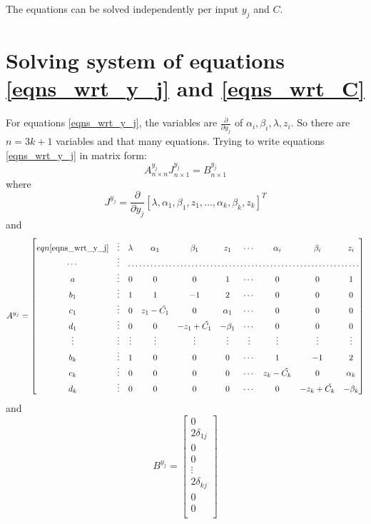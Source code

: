 \documentclass[11 pt]{article}
\begin{document}
The equations can be solved independently per input $y_j$ and $C$.


\section{Solving system of equations \ref{eqns_wrt_y_j} and \ref{eqns_wrt_C}} \label{section_solving_eqns}

For equations \ref{eqns_wrt_y_j}, the variables are $\frac{\partial}{\partial y_j}$ of $\alpha_i,\beta_i,\lambda,z_i$. So there are $n=3k + 1$ variables and that many equations.
Trying to write equations \ref{eqns_wrt_y_j} in matrix form:
\[A_{n \times n}^{y_j}J_{n \times 1}^{y_j} = B_{n \times 1}^{y_j}\]
where
\[J^{y_j} = \frac{\partial}{\partial y_j}[\lambda,\alpha_1,\beta_1,z_1,...,\alpha_k,\beta_k,z_k]^T\]
and
\[
A^{y_j} = \begin{bmatrix}
    eqn \ref{eqns_wrt_y_j} & \vdots & \lambda & \alpha_1 & \beta_1 & z_1 & \cdots & \alpha_i & \beta_i & z_i \\
    \cdots & \vdots & \hdotsfor{8} \\
    a & \vdots & 0 & 0 & 0 & 1 & \cdots & 0 & 0 & 1 \\
    b_1 & \vdots & 1 & 1 & -1 & 2 & \cdots & 0 & 0 & 0 \\
    c_1 & \vdots & 0 & z_1-\hat{C_1} & 0 & \alpha_1 & \cdots & 0 & 0 & 0 \\
    d_1 & \vdots & 0 & 0 & -z_1+\check{C_1} & -\beta_1 & \cdots & 0 & 0 & 0 \\
    \vdots & \vdots & \vdots & \vdots & \vdots & \vdots & \vdots & \vdots & \vdots & \vdots \\
    b_k & \vdots & 1 & 0 & 0 & 0 & \cdots & 1 & -1 & 2 \\
    c_k & \vdots & 0 & 0 & 0 & 0 & \cdots & z_k-\hat{C_k} & 0 & \alpha_k \\
    d_k & \vdots & 0 & 0 & 0 & 0 & \cdots & 0 & -z_k+\check{C_k} & -\beta_k \\
\end{bmatrix}
\]
and
\[
B^{y_j} = \begin{bmatrix}
    0 \\
    2\delta_{1j} \\
    0 \\
    0 \\
    \vdots \\
    2\delta_{kj} \\
    0 \\
    0 \\
\end{bmatrix}
\]
\end{document}
